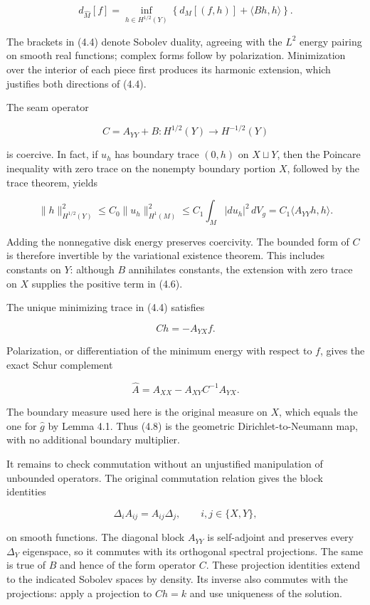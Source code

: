 \documentclass[11pt]{article}
\begin{document}
\[
d_{\widehat M}[f]
=\inf_{h\in H^{1/2}(Y)}
\left\{d_M[(f,h)]+\langle Bh,h\rangle\right\}.
\tag{4.4}
\]

The brackets in (4.4) denote Sobolev duality, agreeing with the \(L^2\)
energy pairing on smooth real functions; complex forms follow by
polarization. Minimization over the interior of each piece first
produces its harmonic extension, which justifies both directions of
(4.4).

The seam operator

\[
C=A_{YY}+B:H^{1/2}(Y)\longrightarrow H^{-1/2}(Y)
\tag{4.5}
\]

is coercive. In fact, if \(u_h\) has boundary trace \((0,h)\) on
\(X\sqcup Y\), then the Poincare inequality with zero trace on the
nonempty boundary portion \(X\), followed by the trace theorem, yields

\[
\|h\|_{H^{1/2}(Y)}^2
\leq C_0\|u_h\|_{H^1(M)}^2
\leq C_1\int_M|du_h|^2\,dV_g
=C_1\langle A_{YY}h,h\rangle.
\tag{4.6}
\]

Adding the nonnegative disk energy preserves coercivity. The bounded
form of \(C\) is therefore invertible by the variational existence
theorem. This includes constants on \(Y\): although \(B\) annihilates
constants, the extension with zero trace on \(X\) supplies the positive
term in (4.6).

The unique minimizing trace in (4.4) satisfies

\[
Ch=-A_{YX}f.
\tag{4.7}
\]

Polarization, or differentiation of the minimum energy with respect to
\(f\), gives the exact Schur complement

\[
\widehat A=A_{XX}-A_{XY}C^{-1}A_{YX}.
\tag{4.8}
\]

The boundary measure used here is the original measure on \(X\), which
equals the one for \(\widehat g\) by Lemma 4.1. Thus (4.8) is the
geometric Dirichlet-to-Neumann map, with no additional boundary
multiplier.

It remains to check commutation without an unjustified manipulation of
unbounded operators. The original commutation relation gives the block
identities

\[
\Delta_iA_{ij}=A_{ij}\Delta_j,
\qquad i,j\in\{X,Y\},
\tag{4.9}
\]

on smooth functions. The diagonal block \(A_{YY}\) is self-adjoint and
preserves every \(\Delta_Y\) eigenspace, so it commutes with its
orthogonal spectral projections. The same is true of \(B\) and hence of
the form operator \(C\). These projection identities extend to the
indicated Sobolev spaces by density. Its inverse also commutes with the
projections: apply a projection to \(Ch=k\) and use uniqueness of the
solution.
\end{document}
